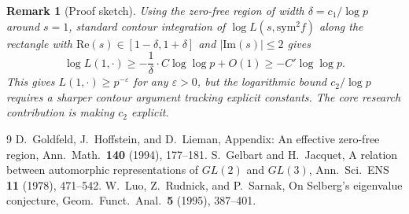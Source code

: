 \documentclass[12pt]{article}
\newtheorem{remark}[theorem]{Remark}
\begin{document}
\begin{remark}[Proof sketch]
Using the zero-free region of width $\delta = c_1/\log p$ around $s=1$, standard
contour integration of $\log L(s, \mathrm{sym}^2 f)$ along the rectangle with
$\mathrm{Re}(s) \in [1-\delta, 1+\delta]$ and $|\mathrm{Im}(s)| \leq 2$ gives
\[
  \log L(1, \cdot) \geq -\frac{1}{\delta}\cdot C \log\log p + O(1)
                  \geq -C' \log\log p.
\]
This gives $L(1, \cdot) \geq p^{-\varepsilon}$ for any $\varepsilon > 0$, but the
logarithmic bound $c_2/\log p$ requires a sharper contour argument tracking
explicit constants.  The core research contribution is making $c_2$ explicit.
\end{remark}

\begin{thebibliography}{9}
 D.~Goldfeld, J.~Hoffstein, and D.~Lieman, Appendix: An effective
  zero-free region, Ann.\ Math.\ \textbf{140} (1994), 177--181.
 S.~Gelbart and H.~Jacquet, A relation between automorphic
  representations of $GL(2)$ and $GL(3)$, Ann.\ Sci.\ ENS \textbf{11} (1978), 471--542.
 W.~Luo, Z.~Rudnick, and P.~Sarnak, On Selberg's eigenvalue conjecture,
  Geom.\ Funct.\ Anal.\ \textbf{5} (1995), 387--401.
\end{thebibliography}
\end{document}
